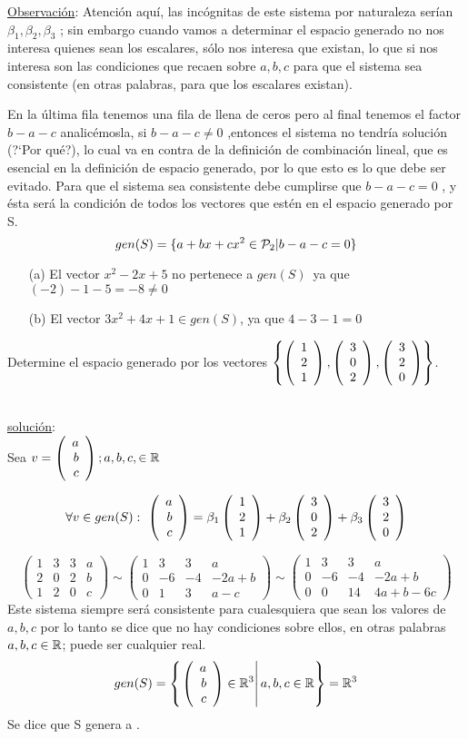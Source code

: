 \underline{Observación}: Atención aquí, las incógnitas de este sistema por naturaleza serían $\beta_1, \beta_2, \beta_3$
; sin embargo cuando vamos a determinar el espacio generado no nos interesa quienes sean los escalares, sólo nos interesa que existan, lo que si nos interesa son las condiciones que recaen sobre $a,b,c$
para que el sistema sea consistente (en otras palabras, para que los escalares existan).


En la última fila tenemos una fila de llena de ceros pero al final tenemos el factor $b-a-c$
analicémosla, si $b-a-c\neq 0$
,entonces el sistema no tendría solución (?`Por qué?), lo cual va
en contra de la definición de combinación lineal, que es esencial en la definición de espacio
generado, por lo que esto es lo que debe ser evitado. Para que el sistema sea consistente debe cumplirse que $b-a-c=0$
, y ésta será la condición de todos los vectores que estén en el
espacio generado por S.
\[gen(S)=
\lbrace
a+b x+c x^2 \in \mathcal{P}_2|
b-a-c=0
\rbrace
\]
\begin{enumerate}

\item[(a)] El vector $x^2-2x+5$ no pertenece a $gen(S)$\ ya que $(-2)-1-5=-8\neq 0$
\item[(b)] El vector $3x^2+4x+1 \in gen(S)$, ya que $4-3-1=0$
\end{enumerate}

\begin{ejemplo}
Determine el espacio generado por los vectores $\left\{ \left( \begin{array}{r} 1\\ 2\\ 1 \end{array} \right) , \left( \begin{array}{r} 3\\ 0\\ 2 \end{array} \right) , \left( \begin{array}{r} 3\\ 2\\ 0 \end{array} \right) \right\}$.
\end{ejemplo}

~\\
\underline{solución}:
~\\

Sea $v=\left( \begin{array}{r} a\\ b\\ c \end{array} \right) ; a, b, c, \in \mathbb{R}$

\[
\forall v\in gen(S):\ 
\vectrtres{a}{b}{c}=
\beta_1\vectrtres{1}{2}{1}+
\beta_2\vectrtres{3}{0}{2}+
\beta_3\vectrtres{3}{2}{0}
\]

\[
\left(
\begin{array}{rrr|r}
1&3&3&a\\
2&0&2&b\\
1&2&0&c
\end{array}
\right)
\sim
\left(
\begin{array}{rrr|r}
1&3&3&a\\
0&-6&-4&-2a+b\\
0&1&3&a-c
\end{array}
\right)
\sim
\left(
\begin{array}{rrr|r}
1&3&3&a\\
0&-6&-4&-2a+b\\
0&0&14&4a+b-6c
\end{array}
\right)
\]
Este sistema siempre ser\'a consistente para cualesquiera que sean los valores de $a, b, c$ por lo
tanto se dice que no hay condiciones sobre ellos, en otras palabras $a, b, c \in \mathbb{R}$; puede ser
cualquier real.
\[
gen(S)=
\left\{
\left.
\left( \begin{array}{r} a\\ b\\ c \end{array} \right)  \in \mathbb{R}^3 \right|
a, b, c \in \mathbb{R}
\right\}=\mathbb{R}^3
\]
Se dice que S genera a \rtres.

